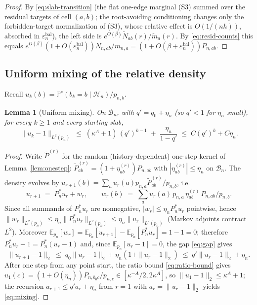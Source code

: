 \documentclass[11pt]{article}
\newcommand{\E}{\mathbb{E}}
\newcommand{\Prob}{\mathbb{P}}
\newcommand{\1}{\mathbf{1}}
\newcommand{\eps}{\varepsilon}
\newcommand{\cB}{\mathcal{B}}
\newcommand{\cH}{\mathcal{H}}
\newtheorem{lemma}[theorem]{Lemma}
\theoremstyle{remark}
\begin{document}
\begin{proof}
By \eqref{eq:slab-transition} (the flat one-edge marginal (S3) summed over
the residual targets of cell $(a,b)$; the root-avoiding conditioning changes
only the forbidden-target normalization of (S3), whose relative effect is
$O(1/(nh))$, absorbed in $\eps_n^{\mathrm{bal}}$), the left side is
$e^{O(\beta)}\widetilde N_{ab}(r)/\widetilde m_a(r)$. By
\eqref{eq:resid-counts} this equals
$e^{O(\beta)}(1+O(\eps_n^{\mathrm{bal}}))N_{n,ab}/m_{n,a}
=(1+O(\beta+\eps_n^{\mathrm{bal}}))P_{n,ab}$.
\end{proof}

\subsection{Uniform mixing of the relative density}
Recall $u_k(b)=\Prob^\circ(b_k=b\mid\cH_n)/p_{n,b}$.

\begin{lemma}[Uniform mixing]\label{lem:mixing}
On $\cB_n$, with $q'=q_0+\eta_n$ (so $q'<1$ for $\eta_n$ small), for every
$k\ge1$ and every starting slab,
\begin{equation}\label{eq:mixing}
\bigl\|u_k-1\bigr\|_{L^2(p_n)}
\;\le\;(\kappa^A+1)\,(q')^{k-1}\;+\;\frac{\eta_n}{1-q'}
\;\le\;C(q')^k+C\eta_n.
\end{equation}
\end{lemma}

\begin{proof}
Write $\tilde P^{(r)}$ for the random (history-dependent) one-step kernel of
Lemma~\ref{lem:onestep}: $\tilde P^{(r)}_{ab}=(1+\eta_{ab}^{(r)})P_{n,ab}$
with $|\eta_{ab}^{(r)}|\le\eta_n$ on $\cB_n$. The density evolves by
$u_{r+1}(b)=\sum_a u_r(a)p_{n,a}\tilde P^{(r)}_{ab}/p_{n,b}$, i.e.
\[
u_{r+1}\;=\;P_n^*u_r+w_r,\qquad
w_r(b)\;=\;\sum_a u_r(a)\,p_{n,a}\,\eta_{ab}^{(r)}\,P_{n,ab}/p_{n,b}.
\]
Since all summands of $P_n^*u_r$ are nonnegative,
$|w_r|\le\eta_n P_n^*u_r$ pointwise, hence
$\|w_r\|_{L^2(p_n)}\le\eta_n\|P_n^*u_r\|_{L^2(p_n)}
\le\eta_n\|u_r\|_{L^2(p_n)}$ (Markov adjoints contract $L^2$). Moreover
$\E_{p_n}[w_r]=\E_{p_n}[u_{r+1}]-\E_{p_n}[P_n^*u_r]=1-1=0$; therefore
$P_n^*u_r-1=P_n^*(u_r-1)$ and, since $\E_{p_n}[u_r-1]=0$, the gap
\eqref{eq:gap} gives
\[
\|u_{r+1}-1\|_2\;\le\;q_0\|u_r-1\|_2+\eta_n(1+\|u_r-1\|_2)
\;\le\;q'\|u_r-1\|_2+\eta_n.
\]
After one step from any point start, the ratio bound \eqref{eq:ratio-bound}
gives $u_1(c)=(1+O(\eta_n))P_{n,b_0c}/p_{n,c}\in[\kappa^{-A}/2,2\kappa^A]$,
so $\|u_1-1\|_2\le\kappa^A+1$; the recursion
$a_{r+1}\le q'a_r+\eta_n$ from $r=1$ with $a_r=\|u_r-1\|_2$ yields
\eqref{eq:mixing}.
\end{proof}
\end{document}
